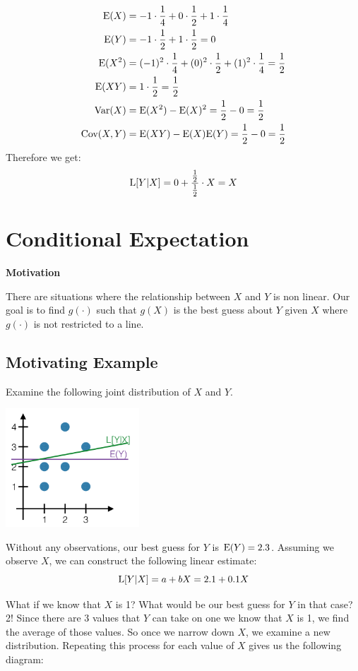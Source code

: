 \documentclass{exam}
\begin{document}
\begin{align*}
\text{E}(X) &= -1 \cdot \frac{1}{4} + 0 \cdot \frac{1}{2} + 1 \cdot \frac{1}{4}\\
\text{E}(Y) &= -1\cdot \frac{1}{2} + 1 \cdot \frac{1}{2} = 0\\
\text{E}(X^2) &= (-1)^2 \cdot \frac{1}{4} + (0)^2 \cdot \frac{1}{2} + (1)^2 \cdot \frac{1}{4} = \frac{1}{2}\\
\text{E}(XY) &= 1 \cdot \frac{1}{2} = \frac{1}{2}\\
\text{Var}(X) &= \text{E}(X^2) - \text{E}(X)^2 = \frac{1}{2} - 0 = \frac{1}{2}\\
\text{Cov}(X, Y) &= \text{E}(XY) - \text{E}(X) \text{E}(Y) = \frac{1}{2} - 0 = \frac{1}{2}
\end{align*}
Therefore we get: 
\[\text{L}[Y | X] = 0 + \frac{\frac{1}{2}}{\frac{1}{2}} \cdot X = X\]

\clearpage

\section{Conditional Expectation}

\textbf{Motivation}

There are situations where the relationship between $X$ and $Y$ is non linear. Our goal is to find $g(\cdot)$ such that $g(X)$ is the best guess about $Y$ given $X$ where $g(\cdot)$ is not restricted to a line.

\subsection{Motivating Example}
Examine the following joint distribution of $X$ and $Y$. 
\begin{center}
\includegraphics[width=5cm]{llse_condexp.jpg}
\end{center}

Without any observations, our best guess for $Y$ is $\text{E}(Y) = 2.3$. Assuming we observe $X$, we can construct the following linear estimate: 
\[\text{L}[Y | X ]  = a + bX = 2.1 + 0.1X\]

What if we know that $X$ is 1? What would be our best guess for $Y$ in that case? 2! Since there are 3 values that $Y$ can take on one we know that $X$ is 1, we find the average of those values. So once we narrow down $X$, we examine a new distribution. Repeating this process for each value of $X$ gives us the following diagram:
\end{document}
